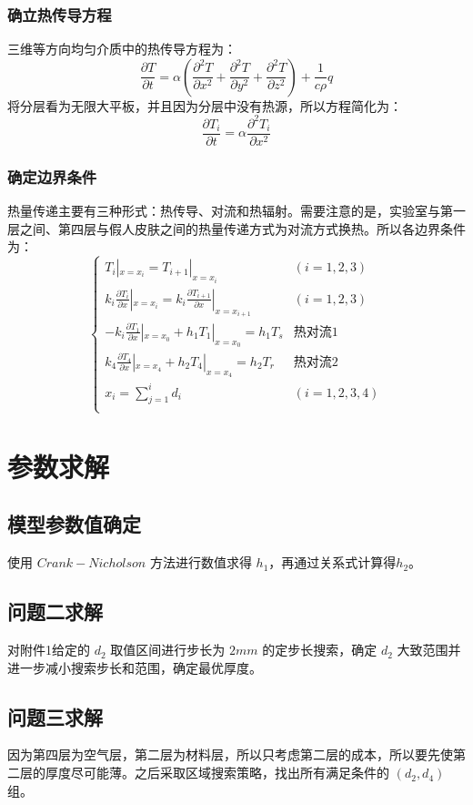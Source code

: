 \documentclass[12pt,a4paper]{article}
\begin{document}
\subsubsection{确立热传导方程}
三维等方向均匀介质中的热传导方程为：
$$\frac{\partial T}{\partial t} = \alpha(\frac{\partial^2T}{\partial x^2} + \frac{\partial^2T}{\partial y^2} + \frac{\partial^2T}{\partial z^2}) + \frac{1}{c\rho}q$$
将分层看为无限大平板，并且因为分层中没有热源，所以方程简化为：
$$\frac{\partial T_i}{\partial t} = \alpha \frac{\partial^2T_i}{\partial x^2}$$
\subsubsection{确定边界条件}
热量传递主要有三种形式：热传导、对流和热辐射。需要注意的是，实验室与第一层之间、第四层与假人皮肤之间的热量传递方式为对流方式换热。所以各边界条件为：
\begin{equation*}
  \left\{
  \begin{array}{ll}
    T_i|_{x = x_i} = T_{i+1}|_{x = x_i} & (i = 1, 2, 3)\\
    k_i\frac{\partial T_i}{\partial x}|_{x = x_i} = k_i\frac{\partial T_{i+1}}{\partial x}|_{x = x_{i+1}} & (i = 1, 2, 3)\\
    -k_i\frac{\partial T_1}{\partial x}|_{x = x_0} + h_1T_1|_{x = x_0} = h_1T_s & \text{热对流1} \\
    k_4\frac{\partial T_4}{\partial x}|_{x = x_4} + h_2T_4|_{x = x_4} = h_2T_r & \text{热对流2}\\
    x_i = \sum_{j = 1}^id_i & (i = 1, 2, 3, 4)\\
  \end{array}
  \right.
\end{equation*}

\section{参数求解}
\subsection{模型参数值确定}
使用 $Crank-Nicholson$ 方法进行数值求得 $h_1$，再通过关系式计算得$h_2$。
\subsection{问题二求解}
对附件1给定的 $d_2$ 取值区间进行步长为 $2mm$ 的定步长搜索，确定 $d_2$ 大致范围并进一步减小搜索步长和范围，确定最优厚度。
\subsection{问题三求解}
因为第四层为空气层，第二层为材料层，所以只考虑第二层的成本，所以要先使第二层的厚度尽可能薄。之后采取区域搜索策略，找出所有满足条件的 $(d_2, d_4)$ 组。
\end{document}

